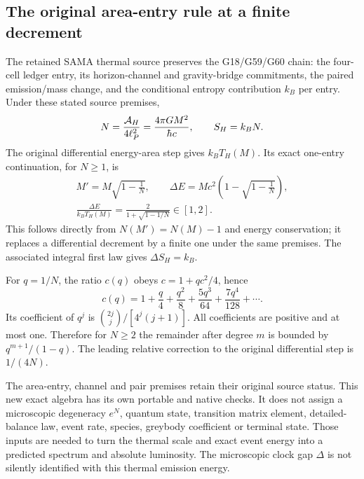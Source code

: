 \documentclass[10pt,twocolumn,letterpaper]{article}
\renewcommand{\hbar}{\mathchar'26\mkern-9mu h}
\begin{document}
\subsection{The original area-entry rule at a finite decrement}
The retained SAMA thermal source preserves the G18/G59/G60 chain:
the four-cell ledger entry, its horizon-channel and gravity-bridge
commitments, the paired emission/mass change, and the conditional entropy
contribution $k_B$ per entry. Under these stated source premises,
\begin{equation}
 N=\frac{\mathcal A_H}{4\ell_P^2}
   =\frac{4\pi GM^2}{\hbar c},\qquad S_H=k_BN.
 \label{eq:th-N}
\end{equation}
The original differential energy-area step gives $k_BT_H(M)$. Its exact
one-entry continuation, for $N\geq1$, is
\begin{equation}
\begin{gathered}
 M'=M\sqrt{1-\frac1N},\qquad
 \Delta E=Mc^2\left(1-\sqrt{1-\frac1N}\right),\\
 \frac{\Delta E}{k_BT_H(M)}
   =\frac{2}{1+\sqrt{1-1/N}}\in[1,2].
\end{gathered}
\label{eq:th-exact-step}
\end{equation}
This follows directly from $N(M')=N(M)-1$ and energy conservation;
it replaces a differential decrement by a finite one under the same
premises. The associated integral first law gives $\Delta S_H=k_B$.

For $q=1/N$, the ratio $c(q)$ obeys $c=1+qc^2/4$, hence
\begin{equation}
 c(q)=1+\frac q4+\frac{q^2}{8}+\frac{5q^3}{64}
             +\frac{7q^4}{128}+\cdots.
 \label{eq:th-series}
\end{equation}
Its coefficient of $q^j$ is $\binom{2j}{j}/[4^j(j+1)]$.
All coefficients are positive and at most one. Therefore for $N\geq2$
the remainder after degree $m$ is bounded by
$q^{m+1}/(1-q)$. The leading relative correction to the original
differential step is $1/(4N)$.

The area-entry, channel and pair premises retain their original source
status. This new exact algebra has its own portable and native checks.
It does not assign a microscopic degeneracy $e^N$, quantum state,
transition matrix element, detailed-balance law, event rate, species,
greybody coefficient or terminal state. Those inputs are needed to turn
the thermal scale and exact event energy into a predicted spectrum and
absolute luminosity. The microscopic clock gap $\Delta$ is not silently
identified with this thermal emission energy.
\end{document}
